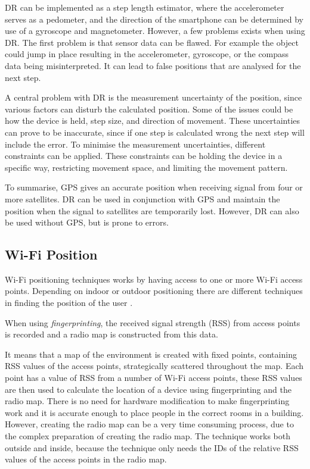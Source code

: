 DR can be implemented as a step length estimator, where the accelerometer serves as a pedometer, and the direction of the smartphone can be determined by use of a gyroscope and magnetometer.
However, a few problems exists when using DR.
The first problem is that sensor data can be flawed. 
For example the object could jump in place resulting in the accelerometer, gyroscope, or the compass data being misinterpreted. 
It can lead to false positions that are analysed for the next step.

A central problem with DR is the measurement uncertainty of the position, since various factors can disturb the calculated position. 
Some of the issues could be how the device is held, step size, and direction of movement.
These uncertainties can prove to be inaccurate, since if one step is calculated wrong the next step will include the error.
To minimise the measurement uncertainties, different constraints can be applied. 
These constraints can be holding the device in a specific way, restricting movement space, and limiting the movement pattern.

To summarise, GPS gives an accurate position when receiving signal from four or more satellites. 
DR can be used in conjunction with GPS and maintain the position when the signal to satellites are temporarily lost. 
However, DR can also be used without GPS, but is prone to errors. 

\subsection{Wi-Fi Position}\label{subsection:wi-fi}
Wi-Fi positioning techniques works by having access to one or more Wi-Fi access points.
Depending on indoor or outdoor positioning there are different techniques in finding the position of the user \citep{Techreport:Robin}.

When using \textit{fingerprinting}, the received signal strength (RSS) from access points is recorded and a radio map is constructed from this data.

It means that a map of the environment is created with fixed points, containing RSS values of the access points, strategically scattered throughout the map. 
Each point has a value of RSS from a number of Wi-Fi access points, these RSS values are then used to calculate the location of a device using fingerprinting and the radio map.
There is no need for hardware modification to make fingerprinting work and it is accurate enough to place people in the correct rooms in a building.
However, creating the radio map can be a very time consuming process, due to the complex preparation of creating the radio map. 
The technique works both outside and inside, because the technique only needs the IDs of the relative RSS values of the access points in the radio map.

